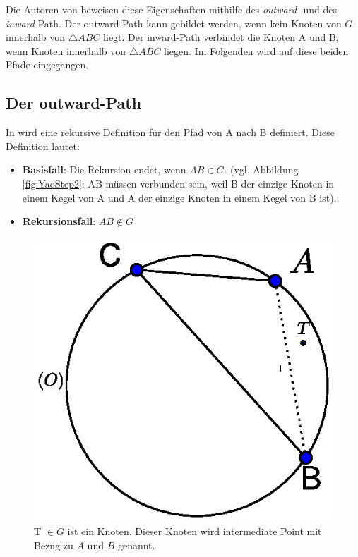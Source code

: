 \documentclass[a4paper,twoside]{IEEEtran}
\begin{document}
Die Autoren von \cite{kanj} beweisen diese Eigenschaften mithilfe des \emph{outward}- und des \emph{inward}-Path. %
Der outward-Path kann gebildet werden, wenn kein Knoten von $G $ innerhalb von $\triangle {ABC} $ liegt.
Der inward-Path verbindet die Knoten A und B, wenn Knoten innerhalb von $\triangle {ABC} $ liegen.
Im Folgenden wird auf diese beiden Pfade eingegangen.

\subsection{Der outward-Path}
In \cite{kanj} wird eine rekursive Definition für den Pfad von A nach B definiert. 
Diese Definition lautet:

\begin{itemize}
\item \textbf{Basisfall}: Die Rekursion endet, wenn $AB \in G $. (vgl. Abbildung \ref{fig:YaoStep2}: AB müssen verbunden sein, weil B der einzige Knoten in einem Kegel von A  und A der einzige Knoten in einem Kegel von B ist).
\item \textbf{Rekursionsfall}: $AB \notin G $
\end{itemize}

\begin{figure}[h!]
\centering
\includegraphics[width=1\linewidth]{outward_path1.eps}
\caption{T $\in G $ ist ein Knoten. Dieser Knoten wird intermediate Point mit Bezug zu $A $ und $B $ genannt.}
\label{fig:intermediate}
\end{figure}
\end{document}
